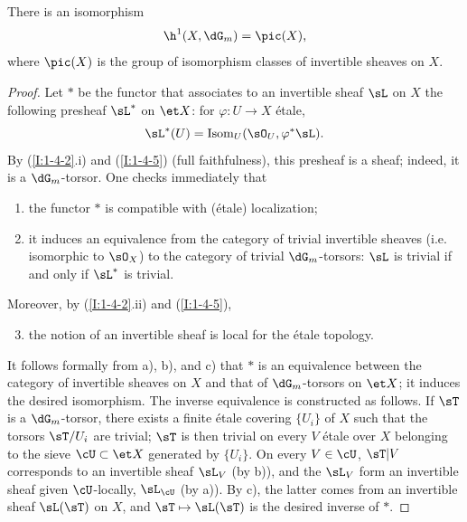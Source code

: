 \documentclass[oneside]{book}
\begin{document}
\begin{proposition}\label{I:2-2-3}
There is an isomorphism
\[
  \h^1(X,\dG_m) = \pic(X)\text{,}
\]
where $\pic(X)$ is the group of isomorphism classes of invertible sheaves
on $X$.
\end{proposition}
\begin{proof}
Let $*$ be the functor that associates to an invertible sheaf $\sL$ on
$X$ the following presheaf $\sL^*$ on $\et X$: for
$\varphi:U\to X$ étale,
\[
  \sL^*(U)=\operatorname{Isom}_U(\sO_U,\varphi^*\sL)\text{.}
\]
By (\ref{I:1-4-2}.i) and (\ref{I:1-4-5}) (full faithfulness), this
presheaf is a sheaf; indeed, it is a $\dG_m$-torsor. One checks
immediately that
\begin{enumerate}[\indent a)]
  \item the functor $*$ is compatible with (étale) localization;
  \item it induces an equivalence from the category of trivial invertible
    sheaves (i.e. isomorphic to $\sO_X$) to the category of trivial
    $\dG_m$-torsors: $\sL$ is trivial if and only if $\sL^*$ is trivial.
\end{enumerate}

Moreover, by (\ref{I:1-4-2}.ii) and (\ref{I:1-4-5}),
\begin{enumerate}[\indent a)]
\setcounter{enumi}{2}
  \item the notion of an invertible sheaf is local for the étale topology.
\end{enumerate}

It follows formally from a), b), and c) that $*$ is an equivalence between
the category of invertible sheaves on $X$ and that of $\dG_m$-torsors on
$\et X$; it induces the desired isomorphism. The inverse equivalence is
constructed as follows. If $\sT$ is a $\dG_m$-torsor, there exists a
finite étale covering $\{U_i\}$ of $X$ such that the torsors
$\sT/U_i$ are trivial; $\sT$ is then trivial on every $V$ étale over
$X$ belonging to the sieve $\cU\subset\et X$ generated by $\{U_i\}$.
On every $V\in\cU$, $\sT|V$ corresponds to an invertible sheaf $\sL_V$
(by b)), and the $\sL_V$ form an invertible sheaf given $\cU$-locally,
$\sL_\cU$ (by a)). By c), the latter comes from an invertible sheaf
$\sL(\sT)$ on $X$, and $\sT\mapsto\sL(\sT)$ is the desired inverse
of $*$.
\end{proof}
\end{document}
